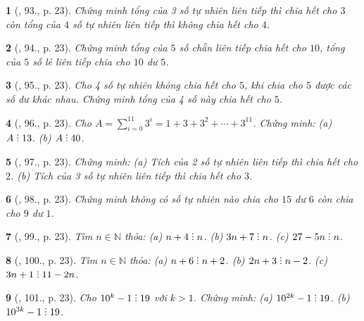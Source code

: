 \documentclass{article}
\newtheorem{baitoan}{}
\DeclareRobustCommand{\divby}{%
	\mathrel{\vbox{\baselineskip.65ex\lineskiplimit0pt\hbox{.}\hbox{.}\hbox{.}}}%
}
\begin{document}
\begin{baitoan}[\cite{Tuyen_Toan_6}, 93., p. 23]
	Chứng minh tổng của 3 số tự nhiên liên tiếp thì chia hết cho $3$ còn tổng của $4$ số tự nhiên liên tiếp thì không chia hết cho $4$.
\end{baitoan}

\begin{baitoan}[\cite{Tuyen_Toan_6}, 94., p. 23]
	Chứng minh tổng của $5$ số chẵn liên tiếp chia hết cho $10$, tổng của $5$ số lẻ liên tiếp chia cho $10$ dư $5$.
\end{baitoan}

\begin{baitoan}[\cite{Tuyen_Toan_6}, 95., p. 23]
	Cho 4 số tự nhiên không chia hết cho $5$, khi chia cho $5$ được các số dư khác nhau. Chứng minh tổng của 4 số này chia hết cho $5$.
\end{baitoan}

\begin{baitoan}[\cite{Tuyen_Toan_6}, 96., p. 23]
	Cho $A = \sum_{i=0}^{11} 3^i = 1 + 3 + 3^2 + \cdots + 3^{11}$. Chứng minh: (a) $A\divby13$. (b) $A\divby40$.
\end{baitoan}

\begin{baitoan}[\cite{Tuyen_Toan_6}, 97., p. 23]
	Chứng minh: (a) Tích của 2 số tự nhiên liên tiếp thì chia hết cho $2$. (b) Tích của 3 số tự nhiên liên tiếp thì chia hết cho $3$.
\end{baitoan}

\begin{baitoan}[\cite{Tuyen_Toan_6}, 98., p. 23]
	Chứng minh không có số tự nhiên nào chia cho $15$ dư $6$ còn chia cho $9$ dư $1$.
\end{baitoan}

\begin{baitoan}[\cite{Tuyen_Toan_6}, 99., p. 23]
	Tìm $n\in\mathbb{N}$ thỏa: (a) $n + 4\divby n$. (b) $3n + 7\divby n$. (c) $27 - 5n\divby n$.
\end{baitoan}

\begin{baitoan}[\cite{Tuyen_Toan_6}, 100., p. 23]
	Tìm $n\in\mathbb{N}$ thỏa: (a) $n + 6\divby n + 2$. (b) $2n + 3\divby n - 2$. (c) $3n + 1\divby11 - 2n$.
\end{baitoan}

\begin{baitoan}[\cite{Tuyen_Toan_6}, 101., p. 23]
	Cho $10^k - 1\divby19$ với $k > 1$. Chứng minh: (a) $10^{2k} - 1\divby19$. (b) $10^{3k} - 1\divby19$.
\end{baitoan}
\end{document}
